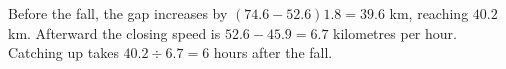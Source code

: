Before the fall, the gap increases by $(74.6-52.6)1.8=39.6$ km, reaching $40.2$ km. Afterward the closing speed is $52.6-45.9=6.7$ kilometres per hour. Catching up takes $40.2\div6.7=\boxed6$ hours after the fall.
